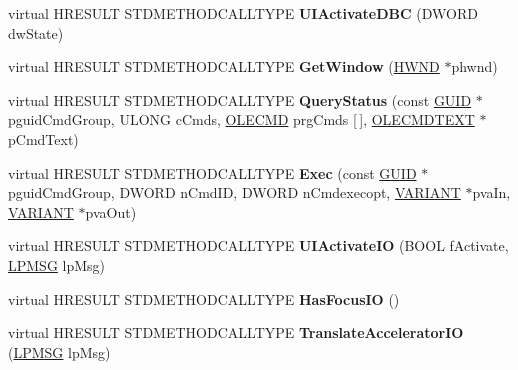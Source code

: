 \begin{DoxyCompactItemize}
virtual H\+R\+E\+S\+U\+LT S\+T\+D\+M\+E\+T\+H\+O\+D\+C\+A\+L\+L\+T\+Y\+PE {\bfseries U\+I\+Activate\+D\+BC} (D\+W\+O\+RD dw\+State)
\item 
\mbox{\label{class_c_menu_site_a9aae7797ec254c77a7a8f540693d60c6}} 
virtual H\+R\+E\+S\+U\+LT S\+T\+D\+M\+E\+T\+H\+O\+D\+C\+A\+L\+L\+T\+Y\+PE {\bfseries Get\+Window} (\hyperlink{interfacevoid}{H\+W\+ND} $\ast$phwnd)
\item 
\mbox{\label{class_c_menu_site_a8069f4d7534aa4879c8b116d15235b96}} 
virtual H\+R\+E\+S\+U\+LT S\+T\+D\+M\+E\+T\+H\+O\+D\+C\+A\+L\+L\+T\+Y\+PE {\bfseries Query\+Status} (const \hyperlink{interface_g_u_i_d}{G\+U\+ID} $\ast$pguid\+Cmd\+Group, U\+L\+O\+NG c\+Cmds, \hyperlink{struct_i_ole_command_target_1_1__tag_o_l_e_c_m_d}{O\+L\+E\+C\+MD} prg\+Cmds \mbox{[}$\,$\mbox{]}, \hyperlink{struct_i_ole_command_target_1_1__tag_o_l_e_c_m_d_t_e_x_t}{O\+L\+E\+C\+M\+D\+T\+E\+XT} $\ast$p\+Cmd\+Text)
\item 
\mbox{\label{class_c_menu_site_a27a751d2da4f29dfef637b258d7a90ce}} 
virtual H\+R\+E\+S\+U\+LT S\+T\+D\+M\+E\+T\+H\+O\+D\+C\+A\+L\+L\+T\+Y\+PE {\bfseries Exec} (const \hyperlink{interface_g_u_i_d}{G\+U\+ID} $\ast$pguid\+Cmd\+Group, D\+W\+O\+RD n\+Cmd\+ID, D\+W\+O\+RD n\+Cmdexecopt, \hyperlink{structtag_v_a_r_i_a_n_t}{V\+A\+R\+I\+A\+NT} $\ast$pva\+In, \hyperlink{structtag_v_a_r_i_a_n_t}{V\+A\+R\+I\+A\+NT} $\ast$pva\+Out)
\item 
\mbox{\label{class_c_menu_site_a6b238fffdb5366f8d5e84259ea9e9ac9}} 
virtual H\+R\+E\+S\+U\+LT S\+T\+D\+M\+E\+T\+H\+O\+D\+C\+A\+L\+L\+T\+Y\+PE {\bfseries U\+I\+Activate\+IO} (B\+O\+OL f\+Activate, \hyperlink{structtag_m_s_g}{L\+P\+M\+SG} lp\+Msg)
\item 
\mbox{\label{class_c_menu_site_adb731afb66e6206e7263a2f2dab9ecd5}} 
virtual H\+R\+E\+S\+U\+LT S\+T\+D\+M\+E\+T\+H\+O\+D\+C\+A\+L\+L\+T\+Y\+PE {\bfseries Has\+Focus\+IO} ()
\item 
\mbox{\label{class_c_menu_site_ae34a256cb234180146b2b806e623befb}} 
virtual H\+R\+E\+S\+U\+LT S\+T\+D\+M\+E\+T\+H\+O\+D\+C\+A\+L\+L\+T\+Y\+PE {\bfseries Translate\+Accelerator\+IO} (\hyperlink{structtag_m_s_g}{L\+P\+M\+SG} lp\+Msg)
\item 

\end{DoxyCompactItemize}

